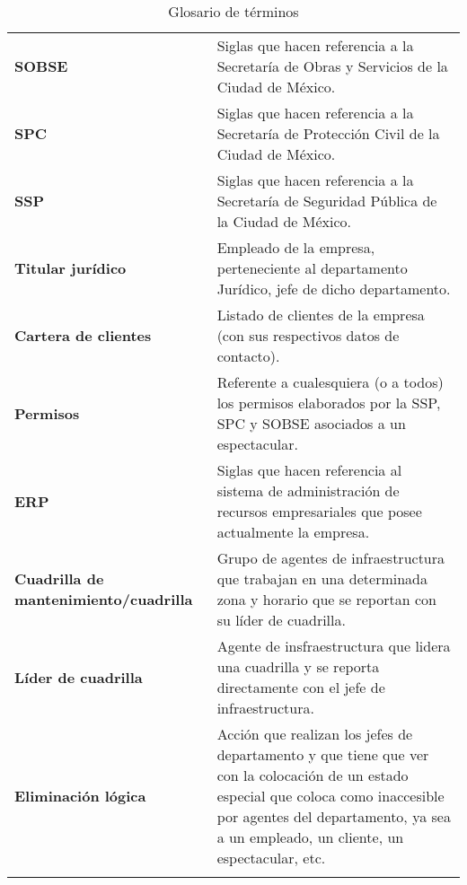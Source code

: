 \begin{longtable}[H]{m{4cm}m{8cm}}
\textbf{SOBSE} & Siglas que hacen referencia a la Secretaría de Obras y Servicios de la Ciudad de México. \tabularnewline

\textbf{SPC} & Siglas que hacen referencia a la Secretaría de Protección Civil de la Ciudad de México. \tabularnewline

\textbf{SSP} & Siglas que hacen referencia a la Secretaría de Seguridad Pública de la Ciudad de México. \tabularnewline

\textbf{Titular jurídico} & Empleado de la empresa, perteneciente al departamento Jurídico, jefe de dicho departamento. \tabularnewline

\textbf{Cartera de clientes} & Listado de clientes de la empresa (con sus respectivos datos de contacto). \tabularnewline

\textbf{Permisos} & Referente a cualesquiera (o a todos) los permisos elaborados por la SSP, SPC y SOBSE asociados a un espectacular. \tabularnewline

\textbf{ERP} & Siglas que hacen referencia al sistema de administración de recursos empresariales que posee actualmente la empresa. \tabularnewline

\textbf{Cuadrilla de mantenimiento/cuadrilla} & Grupo de agentes de infraestructura que trabajan en una determinada zona y horario que se reportan con su líder de cuadrilla. \tabularnewline

\textbf{Líder de cuadrilla} & Agente de insfraestructura que lidera una cuadrilla y se reporta directamente con el jefe de infraestructura. \tabularnewline

\textbf{Eliminación lógica} & Acción que realizan los jefes de departamento y que tiene que ver con la colocación de un estado especial que coloca como inaccesible por agentes del departamento, ya sea a un empleado, un cliente, un espectacular, etc. \tabularnewline

\label{tbl:glosario}
    \caption{Glosario de términos}
    \bottomrule
\end{longtable}